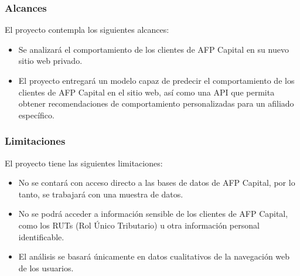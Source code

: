 \subsubsection{Alcances}

El proyecto contempla los siguientes alcances:

\begin{itemize}
\item Se analizará el comportamiento de los clientes de AFP Capital en su nuevo sitio web privado.
\item El proyecto entregará un modelo capaz de predecir el comportamiento de los clientes de AFP Capital en el sitio web, así como una API que permita obtener recomendaciones de comportamiento personalizadas para un afiliado específico.
\end{itemize}

\subsubsection{Limitaciones}

El proyecto tiene las siguientes limitaciones:

\begin{itemize}
\item No se contará con acceso directo a las bases de datos de AFP Capital, por lo tanto, se trabajará con una muestra de datos.
\item No se podrá acceder a información sensible de los clientes de AFP Capital, como los RUTs (Rol Único Tributario) u otra información personal identificable.
\item El análisis se basará únicamente en datos cualitativos de la navegación web de los usuarios.
\end{itemize}